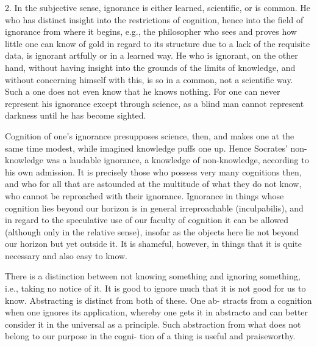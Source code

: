 2. In the subjective sense, ignorance is either learned, scientific, or is common.
He who has distinct insight into the restrictions of cognition,
hence into the field of ignorance from where it begins,
e.g., the philosopher who sees and proves how little one can know of
gold in regard to its structure due to a lack of the requisite data,
is ignorant artfully or in a learned way.
He who is ignorant, on the other hand, without
having insight into the grounds of the limits of knowledge,
and without concerning himself with this, is so in a common, not a scientific way.
Such a one does not even know that he knows nothing.
For one can never represent his ignorance except through science,
as a blind man cannot represent darkness until he has become sighted.

Cognition of one's ignorance presupposes science, then, and
makes one at the same time modest, while imagined knowledge puffs one up.
Hence Socrates' non-knowledge was a laudable ignorance,
a knowledge of non-knowledge, according to his own admission.
It is precisely those who possess very many cognitions then, and
who for all that are astounded at the multitude of what they do not know,
who cannot be reproached with their ignorance.
Ignorance in things whose cognition lies beyond our horizon is in
general irreproachable (inculpabilis), and in regard to the speculative use of
our faculty of cognition it can be allowed (although only in the relative
sense), insofar as the objects here lie not beyond our horizon but yet outside
it. It is shameful, however, in things that it is quite necessary and also easy
to know.

There is a distinction between not knowing something and ignoring
something, i.e., taking no notice of it. It is good to ignore much that it is not
good for us to know. Abstracting is distinct from both of these. One ab-
stracts from a cognition when one ignores its application, whereby one
gets it in abstracto and can better consider it in the universal as a principle.
Such abstraction from what does not belong to our purpose in the cogni-
tion of a thing is useful and praiseworthy.

